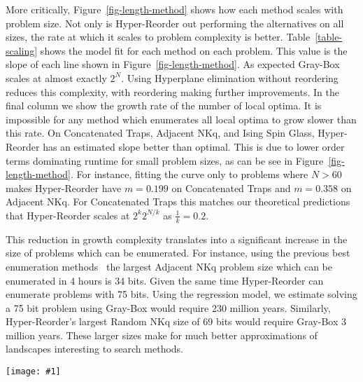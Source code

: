 \documentclass[runningheads,a4paper]{llncs}
\newcommand{\includegraphicsfit}[1]
{\texttt{[image: \#1]}}
\begin{document}
More critically, Figure~\ref{fig-length-method} shows how each method scales with problem size.
Not only is Hyper-Reorder out performing the alternatives on all sizes, the rate at which it
scales to problem complexity is better. Table~\ref{table-scaling} shows the model fit for each
method on each problem. This value is the slope of each line shown in Figure~\ref{fig-length-method}.
As expected Gray-Box scales at almost exactly $2^N$. Using Hyperplane elimination without
reordering reduces this complexity, with reordering making further improvements. In the final
column we show the growth rate of the number of local optima. It is impossible for any method
which enumerates all local optima to grow slower than this rate. On Concatenated Traps, Adjacent
NKq, and Ising Spin Glass, Hyper-Reorder has an estimated slope better than optimal. This is
due to lower order terms dominating runtime for small problem sizes, as can be see in
Figure~\ref{fig-length-method}. For instance, fitting
the curve only to problems where $N>60$ makes Hyper-Reorder have $m=0.199$ on Concatenated Traps and
$m=0.358$ on Adjacent NKq. For Concatenated Traps this matches our theoretical predictions that
Hyper-Reorder scales at $2^k2^{N/k}$ as $\frac{1}{k}=0.2$.

This reduction in growth complexity translates into a significant increase in the size of problems
which can be enumerated. For instance, using the previous best enumeration methods~\cite{ochoa:2015:crossovernetworks}
the largest Adjacent NKq problem size which can be enumerated in 4 hours is 34 bits. Given the same time
Hyper-Reorder can enumerate problems with 75 bits. Using the regression model, we estimate solving
a 75 bit problem using Gray-Box would require 230 million years. Similarly, Hyper-Reorder's largest
Random NKq size of 69 bits would require Gray-Box 3 million years. These larger sizes make for
much better approximations of landscapes interesting to search methods.


\begin{figure*}
  \centering
  \includegraphicsfit{length-method}
  \caption{Comparison of how each method scales with problem size when finding 1-bit local optima
           on log-linear scales. Each point is the mean
           runtime over 30 instances and each line the linear model. All confidence intervals too tight to see.}
  \label{fig-length-method}
\end{figure*}
\end{document}
